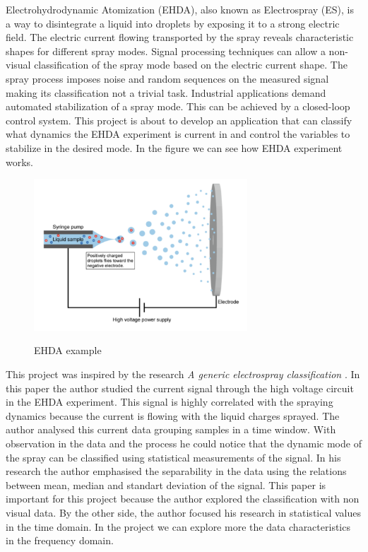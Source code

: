 \documentclass[10pt]{article}
\author{João Pedro Miranda Marques - 2017050495}
\begin{document}


Electrohydrodynamic Atomization (EHDA), also known as Electrospray (ES), is a way to disintegrate a liquid into droplets by exposing it to a strong electric field.
The electric current flowing transported by the spray reveals characteristic shapes for different spray modes.
Signal processing techniques can allow a non-visual classification of the spray mode based on the electric current shape.
The spray process imposes noise and random sequences on the measured signal making its classification not a trivial task. 
Industrial applications demand automated stabilization of a spray mode.
This can be achieved by a closed-loop control system. This project is about to develop an application that can classify what dynamics the EHDA experiment is current in and control
the variables to stabilize in the desired mode. In the figure we can see how EHDA experiment works.

\begin{figure}[H]
    \center
    \includegraphics[width=8cm]{images/electrospray.png}
    \label{img1}
    \caption{EHDA example}
\end{figure}

This project was inspired by the research \emph{A generic electrospray classification} \cite*[]{Sjaaks}.
In this paper the author studied the current signal through the high voltage circuit in the EHDA experiment.
This signal is highly correlated with the spraying dynamics because the current is flowing with the liquid charges sprayed.
The author analysed this current data grouping samples in a time window. With observation in the data and the process he could
notice that the dynamic mode of the spray can be classified using statistical measurements of the signal. In his research the author 
emphasised the separability in the data using the relations between mean, median and standart deviation of the signal. This paper is important
for this project because the author explored the classification with non visual data. By the other side, the author focused his research in statistical values
in the time domain. In the project we can explore more the data characteristics in the frequency domain.
\end{document}
